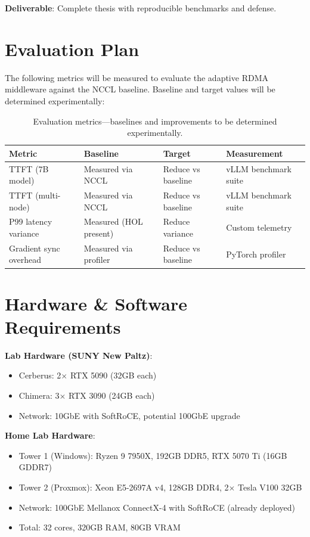 \documentclass[10pt,letterpaper]{article}
\begin{document}
\textbf{Deliverable}: Complete thesis with reproducible benchmarks and defense.

\section{Evaluation Plan}

The following metrics will be measured to evaluate the adaptive RDMA middleware against the NCCL baseline. Baseline and target values will be determined experimentally:

\begin{table}[h]
\centering
\small
\begin{tabular}{@{}llll@{}}
\toprule
\textbf{Metric} & \textbf{Baseline} & \textbf{Target} & \textbf{Measurement} \\
\midrule
TTFT (7B model) & Measured via NCCL & Reduce vs baseline & vLLM benchmark suite \\
TTFT (multi-node) & Measured via NCCL & Reduce vs baseline & vLLM benchmark suite \\
P99 latency variance & Measured (HOL present) & Reduce variance & Custom telemetry \\
Gradient sync overhead & Measured via profiler & Reduce vs baseline & PyTorch profiler \\
\bottomrule
\end{tabular}
\caption{Evaluation metrics---baselines and improvements to be determined experimentally.}
\end{table}

\section{Hardware \& Software Requirements}

\textbf{Lab Hardware (SUNY New Paltz)}:
\begin{itemize}[noitemsep]
    \item Cerberus: 2$\times$ RTX 5090 (32GB each)
    \item Chimera: 3$\times$ RTX 3090 (24GB each)
    \item Network: 10GbE with SoftRoCE, potential 100GbE upgrade
\end{itemize}

\textbf{Home Lab Hardware}:
\begin{itemize}[noitemsep]
    \item Tower 1 (Windows): Ryzen 9 7950X, 192GB DDR5, RTX 5070 Ti (16GB GDDR7)
    \item Tower 2 (Proxmox): Xeon E5-2697A v4, 128GB DDR4, 2$\times$ Tesla V100 32GB
    \item Network: 100GbE Mellanox ConnectX-4 with SoftRoCE (already deployed)
    \item Total: 32 cores, 320GB RAM, 80GB VRAM
\end{itemize}
\end{document}
